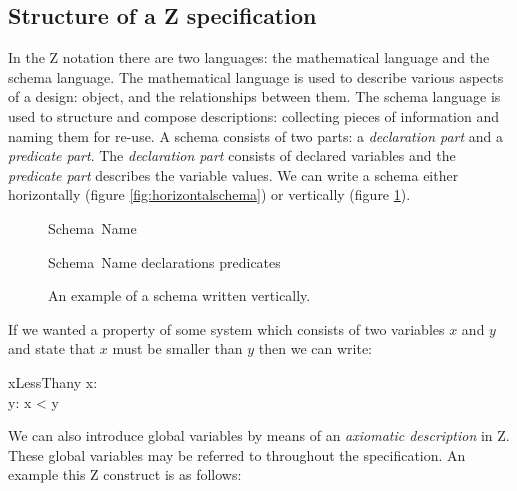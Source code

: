 \subsection{Structure of a Z specification}

In the Z notation there are two languages: the mathematical language and the schema language. The mathematical language is used to describe various aspects of a design: object, and the relationships between them. The schema language is used to structure and compose descriptions: collecting pieces of information and naming them for re-use. A schema consists of two parts: a \emph{declaration part} and a \emph{predicate part}. The \emph{declaration part} consists of declared variables and the \emph{predicate part} describes the variable values. We can write a schema either horizontally (figure \ref{fig:horizontalschema}) or vertically (figure \ref{fig:verticalschema}).

\begin{figure}[H]
\vspace{-0.2in}
\centering
\begin{minipage}{0.45\textwidth}
\begin{zed}
\noindent Schema\ Name 
\end{zed}
\vspace{-0.18in}
\caption{An example of a schema written horizontally.\label{fig:horizontalschema}}
\vspace{-0.2in}
\end{minipage}\hfill
\begin{minipage}{0.45\textwidth}
\begin{schema}{Schema\ Name}
declarations
\where
predicates
\end{schema}
\vspace{-0.2in}
\caption{An example of a schema written vertically. \label{fig:verticalschema}}
\vspace{-0.2in}
\end{minipage}
\end{figure}

If we wanted a property of some system which consists of two variables $x$ and $y$ and state that $x$ must be smaller than $y$ then we can write:

\begin{schema}{xLessThany}
x: \nat \\
y: \nat
\where
x < y
\end{schema}

We can also introduce global variables by means of an \textit{axiomatic description} in Z. These global variables may be referred to throughout the specification. An example this Z construct is as follows:

